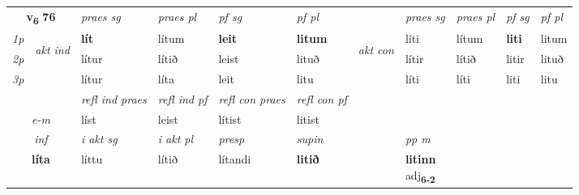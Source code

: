 \noindent
\begin{tabular}{lllllllllll} \toprule
\multicolumn{2}{c}{\textbf{v{\textsubscript{6}}} \Large{\textbf{76}}}  &  \textit{praes sg}  & \textit{praes pl}  &\textit{ pf sg} & \textit{pf pl} &  &  \textit{praes sg}  & \textit{praes pl}  & \textit{pf sg} & \textit{pf pl } \\*
	\cmidrule{3-6} \cmidrule{8-11}
 {\textit{1p}} & \multirow{3}{*}{\begin{turn}{90}\textit{akt ind}\end{turn}} & \textbf{lít} & lítum & \textbf{leit} & \textbf{litum} & \multirow{3}{*}{\begin{turn}{90}\textit{akt con}\end{turn}} &líti & lítum & \textbf{liti} & litum\\*
 {\textit{2p}} &  &  lítur  & lítið & leist & lituð & & lítir & lítið & litir & lituð \\*
{\textit{3p}} &  & lítur & líta & leit & litu & & líti & líti& liti & litu \\*
\cmidrule{3-6} \cmidrule{8-11}

 & & \textit{refl ind praes} & \textit{refl ind pf} & \textit{refl con praes} & \textit{refl con pf} \\*
 \multicolumn{2}{c}{ \textit{e-m} }& líst & leist & lítist & litist \\*

\cmidrule{3-8}
   \multicolumn{2}{c}{\textit{inf}}  & \textit{i akt sg} & \textit{i akt pl}   & \textit{presp} & \textit{supin}  && \textit{pp m} \\*
  \multicolumn{2}{c}{\textbf{líta}} & líttu  & lítið   & lítandi &  \textbf{litið}  && \specialcell{\textbf{litinn} \\ adj\textbf{\textsubscript{6-2}}} \\*
\end{tabular}

